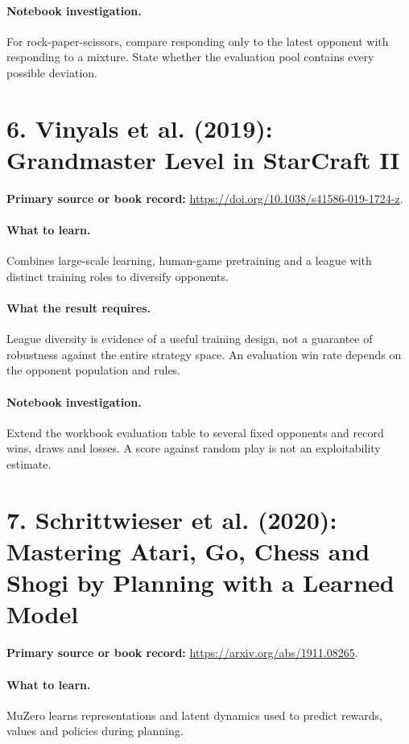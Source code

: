 \documentclass[11pt]{scrartcl}
\begin{document}
\paragraph{Notebook investigation.} For rock-paper-scissors, compare responding only to the latest opponent with responding to a mixture. State whether the evaluation pool contains every possible deviation.

\section*{6. Vinyals et al. (2019): Grandmaster Level in StarCraft II}
\textbf{Primary source or book record:} \url{https://doi.org/10.1038/s41586-019-1724-z}.

\paragraph{What to learn.} Combines large-scale learning, human-game pretraining and a league with distinct training roles to diversify opponents.

\paragraph{What the result requires.} League diversity is evidence of a useful training design, not a guarantee of robustness against the entire strategy space. An evaluation win rate depends on the opponent population and rules.

\paragraph{Notebook investigation.} Extend the workbook evaluation table to several fixed opponents and record wins, draws and losses. A score against random play is not an exploitability estimate.

\section*{7. Schrittwieser et al. (2020): Mastering Atari, Go, Chess and Shogi by Planning with a Learned Model}
\textbf{Primary source or book record:} \url{https://arxiv.org/abs/1911.08265}.

\paragraph{What to learn.} MuZero learns representations and latent dynamics used to predict rewards, values and policies during planning.
\end{document}
